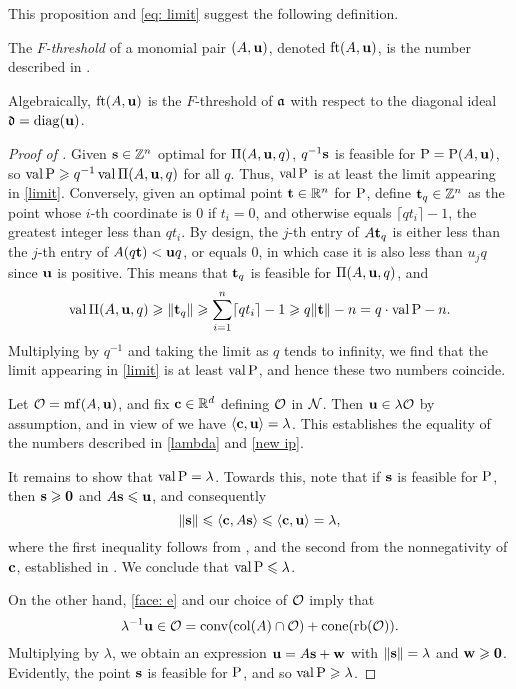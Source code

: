\documentclass[11pt]{amsart}
\begin{document}
This proposition and \eqref{eq: limit} suggest the following definition.

\begin{definition}
   The \emph{$F$-threshold} of a monomial pair $(A, \mathbf{u})$, denoted $\operatorname{ft}(A, \mathbf{u})$, is the number described in .
\end{definition}

Algebraically, $\operatorname{ft}(A, \mathbf{u})$ is the $F$-threshold of $\mathfrak{a}$ with respect to the diagonal ideal $\mathfrak{d} = \operatorname{diag}(\mathbf{u})$.

\begin{proof}[Proof of ]
   Given $\mathbf{s} \in \mathbb{Z}^n$ optimal for $\Pi(A,\mathbf{u},q)$, $q^{-1} \mathbf{s}$ is feasible for $\mathrm{P} = \mathrm{P}(A, \mathbf{u})$, so $\operatorname{val} \mathrm{P} \geqslant q^{-1} \operatorname{val} \Pi(A, \mathbf{u}, q)$ for all $q$.
   Thus, $\operatorname{val} \mathrm{P}$ is at least the limit appearing in \eqref{limit}.
   Conversely, given an optimal point $\mathbf{t} \in \mathbb{R}^n$ for $\mathrm{P}$,
   define $\mathbf{t}_q \in \mathbb{Z}^n$ as the point whose $i$-th coordinate is $0$ if $t_i=0$, and otherwise equals $\lceil q t_i \rceil - 1$, the greatest integer less than $q t_i$.
   By design, the $j$-th entry of $A \mathbf{t}_q$ is either less than the $j$-th entry of $A (q \mathbf{t}) < \mathbf{u} q$, or equals $0$,  in which case it is also less than $u_j q$ since $\mathbf{u}$ is positive. This means that $\mathbf{t}_q$ is feasible for $\Pi(A, \mathbf{u}, q)$, and
   \[\operatorname{val} \Pi(A, \mathbf{u}, q) \geqslant \| \mathbf{t}_q \| \geqslant \sum_{i=1}^n \lceil q t_i \rceil - 1 \geqslant q \| \mathbf{t} \| -n = q \cdot \operatorname{val} \mathrm{P} - n.\]
   Multiplying by $q^{-1}$ and taking the limit as $q$ tends to infinity, we find that the limit appearing in \eqref{limit} is at least $\operatorname{val} \mathrm{P}$, and hence these two numbers coincide.

   Let $\mathcal{O} = \operatorname{mf}(A,\mathbf{u})$, and fix $\mathbf{c} \in \mathbb{R}^d$ defining $\mathcal{O}$ in $\mathcal{N}$.
   Then $\mathbf{u} \in \lambda \mathcal{O}$ by assumption, and in view of  we have $\langle \mathbf{c}, \mathbf{u} \rangle = \lambda$.
   This establishes the equality of the numbers described in \eqref{lambda} and \eqref{new ip}.

   It remains to show that $\operatorname{val} \mathrm{P} = \lambda$.
   Towards this, note that if $\mathbf{s}$ is feasible for $\mathrm{P}$, then $\mathbf{s}\geqslant \mathbf{0}$ and $A \mathbf{s} \leqslant \mathbf{u}$, and consequently
   \[\| \mathbf{s} \| \leqslant \langle \mathbf{c}, A \mathbf{s} \rangle \leqslant \langle \mathbf{c}, \mathbf{u} \rangle = \lambda,\]
   where the first inequality follows from , and the second from the nonnegativity of $\mathbf{c}$, established in .
   We conclude that $\operatorname{val} \mathrm{P} \leqslant \lambda$.

   On the other hand, \eqref{face: e} and our choice of $\mathcal{O}$ imply that
   \begin{equation}\label{cone containment: e}
      \lambda^{-1} \mathbf{u} \in \mathcal{O} = \operatorname{conv}(\operatorname{col}(A) \cap \mathcal{O}) + \operatorname{cone}(\operatorname{rb}(\mathcal{O})).
   \end{equation}
   Multiplying by $\lambda$, we obtain an expression $\mathbf{u} = A \mathbf{s} + \mathbf{w}$ with $\| \mathbf{s} \| = \lambda$ and $\mathbf{w} \geqslant \mathbf{0}$.
   Evidently, the point $\mathbf{s}$ is feasible for $\mathrm{P}$, and so $\operatorname{val} \mathrm{P} \geqslant \lambda$.
\end{proof}
\end{document}
